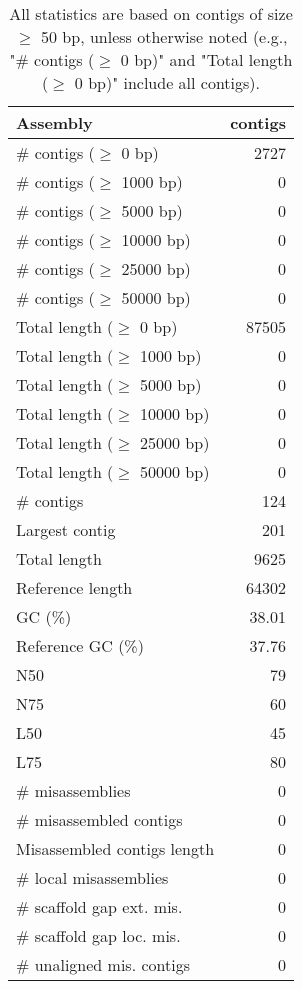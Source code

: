 \documentclass[12pt,a4paper]{article}
\begin{document}
\begin{table}[ht]
\begin{center}
\caption{All statistics are based on contigs of size $\geq$ 50 bp, unless otherwise noted (e.g., "\# contigs ($\geq$ 0 bp)" and "Total length ($\geq$ 0 bp)" include all contigs).}
\begin{tabular}{|l*{1}{|r}|}
\hline
Assembly & contigs \\ \hline
\# contigs ($\geq$ 0 bp) & 2727 \\ \hline
\# contigs ($\geq$ 1000 bp) & 0 \\ \hline
\# contigs ($\geq$ 5000 bp) & 0 \\ \hline
\# contigs ($\geq$ 10000 bp) & 0 \\ \hline
\# contigs ($\geq$ 25000 bp) & 0 \\ \hline
\# contigs ($\geq$ 50000 bp) & 0 \\ \hline
Total length ($\geq$ 0 bp) & 87505 \\ \hline
Total length ($\geq$ 1000 bp) & 0 \\ \hline
Total length ($\geq$ 5000 bp) & 0 \\ \hline
Total length ($\geq$ 10000 bp) & 0 \\ \hline
Total length ($\geq$ 25000 bp) & 0 \\ \hline
Total length ($\geq$ 50000 bp) & 0 \\ \hline
\# contigs & 124 \\ \hline
Largest contig & 201 \\ \hline
Total length & 9625 \\ \hline
Reference length & 64302 \\ \hline
GC (\%) & 38.01 \\ \hline
Reference GC (\%) & 37.76 \\ \hline
N50 & 79 \\ \hline
N75 & 60 \\ \hline
L50 & 45 \\ \hline
L75 & 80 \\ \hline
\# misassemblies & 0 \\ \hline
\# misassembled contigs & 0 \\ \hline
Misassembled contigs length & 0 \\ \hline
\# local misassemblies & 0 \\ \hline
\# scaffold gap ext. mis. & 0 \\ \hline
\# scaffold gap loc. mis. & 0 \\ \hline
\# unaligned mis. contigs & 0 \\ \hline

\end{tabular}
\end{center}
\end{table}
\end{document}

